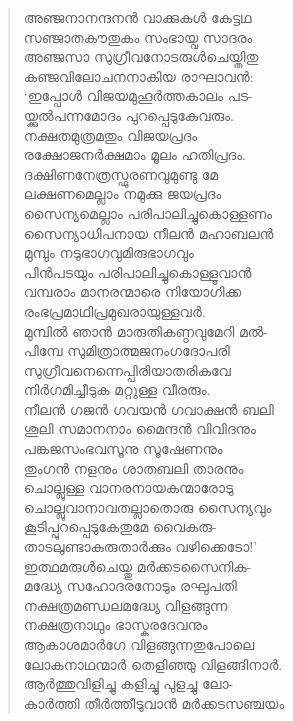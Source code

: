 \begin{verse}
അഞ്ജനാനന്ദനന്‍ വാക്കുകള്‍ കേട്ടഥ\\
സഞ്ജാതകൗതുകം സംഭായ്വ സാദരം\\
അഞ്ജസാ സുഗ്രീവനോടരുള്‍ചെയ്തിതു\\
കഞ്ജവിലോചനനാകിയ രാഘാവന്‍:\\
‘ഇപ്പോള്‍ വിജയമുഹൂര്‍ത്തകാലം പട-\\
യ്ക്കുല്‍പന്നമോദം പുറപ്പെടുകേവരും.\\
നക്ഷതമുത്രമതും വിജയപ്രദം\\
രക്ഷോജനര്‍ക്ഷമാം മൂലം ഹതിപ്രദം.\\
ദക്ഷിണനേത്രസ്ഫുരണവുമുണ്ടു മേ\\
ലക്ഷണമെല്ലാം നമുക്കു ജയപ്രദം\\
സൈന്യമെല്ലാം പരിപാലിച്ചുകൊള്ളണം\\
സൈന്യാധിപനായ നീലന്‍ മഹാബലന്‍\\
മുമ്പും നടുഭാഗവുമിരുഭാഗവും\\
പിന്‍പടയും പരിപാലിച്ചുകൊള്ളൂവാന്‍\\
വമ്പരാം മാനരന്മാരെ നിയോഗിക്ക\\
രംഭപ്രമാഥിപ്രമുഖരായുള്ളവര്‍.\\
മുമ്പില്‍ ഞാന്‍ മാരുതികണ്ഠവുമേറി മല്‍-\\
പിമ്പേ സുമിത്രാത്മജനംഗദോപരി\\
സുഗ്രീവനെന്നെപ്പിരിയാതരികവേ\\
നിര്‍ഗമിച്ചീടുക മറ്റുള്ള വീരരും.\\
നീലന്‍ ഗജന്‍ ഗവയന്‍ ഗവാക്ഷന്‍ ബലി\\
ശൂലി സമാനനാം മൈന്ദന്‍ വിവിദനും\\
പങ്കജസംഭവസൂനു സൂഷേണനും\\
തുംഗന്‍ നളനും ശാതബലി താരനും\\
ചൊല്ലുള്ള വാനരനായകന്മാരോടു\\
ചൊല്ലുവാനാവതല്ലാതൊരു സൈന്യവും\\
കൂടിപ്പുറപ്പെടുകേതുമേ വൈകരു-\\
താടലുണ്ടാകരുതാര്‍ക്കും വഴിക്കെടോ!’\\
ഇത്ഥമരുള്‍ചെയ്തു മര്‍ക്കടസൈനിക-\\
മദ്ധ്യേ സഹോദരനോടും രഘുപതി\\
നക്ഷത്രമണ്ഡലമദ്ധ്യേ വിളങ്ങുന്ന\\
നക്ഷത്രനാഥും ഭാസ്കരദേവനും\\
ആകാശമാര്‍ഗേ വിളങ്ങുന്നതുപോലെ\\
ലോകനാഥന്മാര്‍ തെളിഞ്ഞു വിളങ്ങിനാര്‍.\\
ആര്‍ത്തുവിളിച്ചു കളിച്ചു പുളച്ചു ലോ-\\
കാര്‍ത്തി തീര്‍ത്തീടുവാന്‍ മര്‍ക്കടസഞ്ചയം\\

\end{verse}
